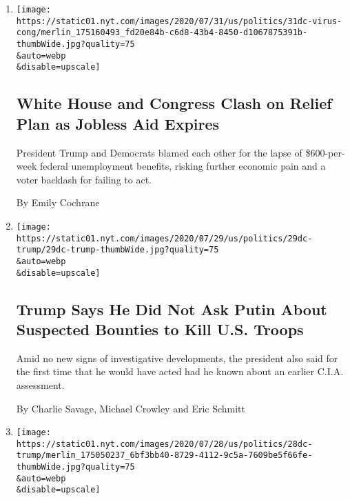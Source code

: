\begin{enumerate}
\def\labelenumi{\arabic{enumi}.}
\item
  \href{/2020/07/31/us/politics/white-house-congress-relief-plan-jobless-aid.html}{}

  \texttt{[image: https://static01.nyt.com/images/2020/07/31/us/politics/31dc-virus-cong/merlin\_175160493\_fd20e84b-c6d8-43b4-8450-d1067875391b-thumbWide.jpg?quality=75\\\&auto=webp\\\&disable=upscale]}

  \hypertarget{white-house-and-congress-clash-on-relief-plan-as-jobless-aid-expires}{%
  \subsection{White House and Congress Clash on Relief Plan as Jobless
  Aid
  Expires}\label{white-house-and-congress-clash-on-relief-plan-as-jobless-aid-expires}}

  President Trump and Democrats blamed each other for the lapse of
  \$600-per-week federal unemployment benefits, risking further economic
  pain and a voter backlash for failing to act.

  By Emily Cochrane
\item
  \href{/2020/07/29/us/politics/trump-putin-bounties.html}{}

  \texttt{[image: https://static01.nyt.com/images/2020/07/29/us/politics/29dc-trump/29dc-trump-thumbWide.jpg?quality=75\\\&auto=webp\\\&disable=upscale]}

  \hypertarget{trump-says-he-did-not-ask-putin-about-suspected-bounties-to-kill-us-troops}{%
  \subsection{Trump Says He Did Not Ask Putin About Suspected Bounties
  to Kill U.S.
  Troops}\label{trump-says-he-did-not-ask-putin-about-suspected-bounties-to-kill-us-troops}}

  Amid no new signs of investigative developments, the president also
  said for the first time that he would have acted had he known about an
  earlier C.I.A. assessment.

  By Charlie Savage, Michael Crowley and Eric Schmitt
\item
  \href{/2020/07/28/us/politics/trump-nobody-likes-me-walks-out-briefing.html}{}

  \texttt{[image: https://static01.nyt.com/images/2020/07/28/us/politics/28dc-trump/merlin\_175050237\_6bf3bb40-8729-4112-9c5a-7609be5f66fe-thumbWide.jpg?quality=75\\\&auto=webp\\\&disable=upscale]}


\end{enumerate}
